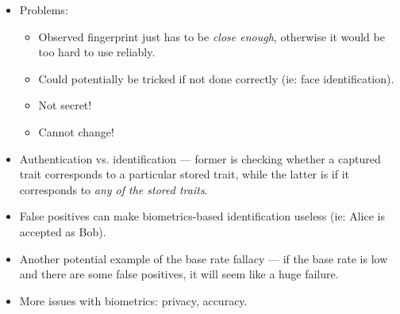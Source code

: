 \documentclass{article}
\begin{document}
\begin{itemize}
    \item Problems:
        \begin{itemize}
            \item Observed fingerprint just has to be \emph{close enough}, otherwise it would be too hard to use reliably.
            \item Could potentially be tricked if not done correctly (ie: face identification).
            \item Not secret!
            \item Cannot change!
        \end{itemize}
    \item Authentication vs. identification --- former is checking whether a captured trait corresponds to a particular stored trait, while the latter is if it corresponds to \emph{any of the stored traits}.
    \item False positives can make biometrics-based identification useless (ie: Alice is accepted as Bob).
    \item Another potential example of the base rate fallacy --- if the base rate is low and there are some false positives, it will seem like a huge failure.
    \item More issues with biometrics: privacy, accuracy.
\end{itemize}
\end{document}
